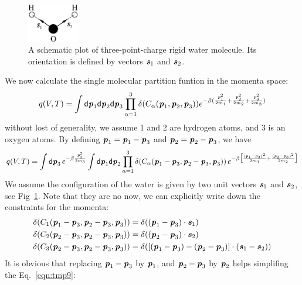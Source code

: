 \documentclass[aip,jcp,a4paper,reprint,onecolumn]{revtex4-1}
\newcommand{\vect}[1]{\textbf{\textit{#1}}}
\newcommand{\dd}[0]{\textsf{d}}
\begin{document}
\begin{figure}
  \centering
  \includegraphics[width=0.2\textwidth]{fig/water.eps}
  \caption{A schematic plot of three-point-charge rigid water molecule.
  Its orientation is defined by vectors $\vect s_1$ and $\vect s_2$.}
  \label{fig:tmp1}
\end{figure}

We now calculate the single molecular partition funtion in the momenta space:
\begin{align}
  q(V,T) =
  \int \dd\vect p_1\dd\vect p_2\dd\vect p_3
  \prod_{\alpha=1}^3
  \delta (C_\alpha (\vect p_1,\vect p_2,\vect p_3))
  e^{-\beta (\frac{\vect p_1^2}{2 m_1} + \frac{\vect p_2^2}{2 m_2} + \frac{\vect p_3^2}{2 m_3})}
\end{align}
without lost of generality, we assume 1 and 2 are hydrogen atoms, and 3 is an oxygen atoms.
By defining ${\vect p}_1 = \vect p_1 - \vect p_3$
and ${\vect p}_2 = \vect p_2 - \vect p_3$, we have
\begin{align}\label{eqn:tmp9}
  q(V,T) =
  \int\dd\vect p_3\,
  e^{-\beta\frac{\vect p_3^2}{2m_3}}
  \int\dd{\vect p}_1\dd\vect p_2
  \prod_{\alpha=1}^3
  \delta (C_\alpha (\vect p_1-\vect p_3,\vect p_2-\vect p_3,\vect p_3))\,
  e^{-\beta \big[\frac{(\vect p_1 - \vect p_3)^2}{2 m_1} + \frac{(\vect p_2 - \vect p_3)^2}{2 m_2}\big]}
\end{align}
We assume the configuration of the water is given by two unit vectors $\vect s_1$ and
$\vect s_2$, see Fig~\ref{fig:tmp1}. Note that they are no
now, we can explicitly write down the constraints for the momenta:
\begin{align}
  \delta(C_1(\vect p_1-\vect p_3,\vect p_2-\vect p_3,\vect p_3))
  &= \delta((\vect p_1-\vect p_3) \cdot \vect s_1)   \\
  \delta(C_2(\vect p_2-\vect p_3,\vect p_2-\vect p_3,\vect p_3))
  &= \delta((\vect p_2-\vect p_3) \cdot \vect s_2)   \\
  \delta(C_3(\vect p_2-\vect p_3,\vect p_2-\vect p_3,\vect p_3))
  &= \delta (
  [(\vect p_1 - \vect p_3) - (\vect p_2 - \vect p_3)] \cdot (\vect s_1  - \vect s_2)
  ) 
\end{align}
It is obvious that replacing $\vect p_1 - \vect p_3$ by $\vect p_1$,
and $\vect p_2 - \vect p_3$ by $\vect p_2$ helps simplifing the Eq.~\eqref{eqn:tmp9}:
\end{document}
